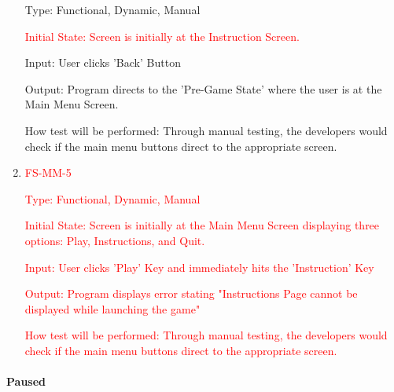 \documentclass[12pt, titlepage]{article}
\begin{document}
\begin{enumerate}
Type: Functional, Dynamic, Manual
					
\textcolor{red}{Initial State: Screen is initially at the Instruction Screen.}
					
Input: User clicks 'Back' Button
					
Output: Program directs to the 'Pre-Game State' where the user is at the Main Menu Screen.
					
How test will be performed: Through manual testing, the developers would check if the main menu buttons direct to the appropriate screen.

\item\textcolor{red}{FS-MM-5\\}

\textcolor{red}{Type: Functional, Dynamic, Manual}
		
\textcolor{red}{Initial State: Screen is initially at the Main Menu Screen displaying three options: Play, Instructions, and Quit.}
					
\textcolor{red}{Input: User clicks 'Play' Key and immediately hits the 'Instruction' Key}
					
\textcolor{red}{Output: Program displays error stating "Instructions Page cannot be displayed while launching the game" }

\textcolor{red}{How test will be performed: Through manual testing, the developers would check if the main menu buttons direct to the appropriate screen.}

\end{enumerate}

\paragraph{Paused}
\end{document}
